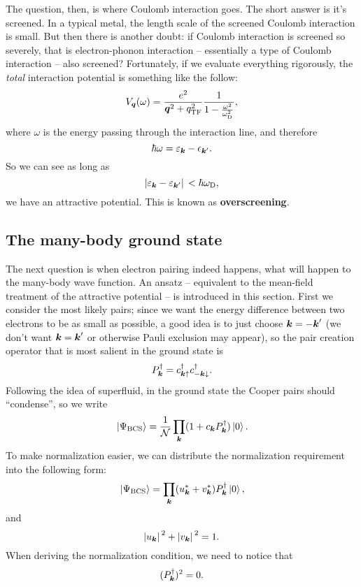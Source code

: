 \documentclass[hyperref, a4paper]{article}
\newcommand*{\concept}[1]{{\textbf{#1}}}
\begin{document}
The question, then, is where Coulomb interaction goes.
The short answer is it's screened.
In a typical metal, 
the length scale of the screened Coulomb interaction is small.
But then there is another doubt: 
if Coulomb interaction is screened so severely, 
that is electron-phonon interaction -- essentially a type of Coulomb interaction 
-- also screened?
Fortunately, if we evaluate everything rigorously, 
the \emph{total} interaction potential is something like the follow:
\begin{equation}
    V_{\vb*{q}}(\omega) = \frac{e^2}{\vb*{q}^2 + q_{\text{TF}}^2} \frac{1}{1 - \frac{\omega^2}{\omega_{\text{D}}^2}},
\end{equation}
where $\omega$ is the energy passing through the interaction line,
and therefore 
\begin{equation}
    \hbar \omega = \varepsilon_{\vb*{k}} - \epsilon_{\vb*{k}'}.
\end{equation} 
So we can see as long as 
\begin{equation}
    \abs*{\varepsilon_{\vb*{k}} - \varepsilon_{\vb*{k}'}}  < \hbar \omega_{\text{D}},
\end{equation}
we have an attractive potential.
This is known as \concept{overscreening}.

\subsection{The many-body ground state}

The next question is when electron pairing indeed happens,
what will happen to the many-body wave function.
An ansatz -- equivalent to the mean-field treatment of the attractive potential -- is 
introduced in this section.
First we consider the most likely pairs;
since we want the energy difference between two electrons to be as small as possible, 
a good idea is to just choose $\vb*{k} = - \vb*{k}'$
(we don't want $\vb*{k} = \vb*{k}'$ 
or otherwise Pauli exclusion may appear),
so the pair creation operator that is 
most salient in the ground state is 
\begin{equation}
    P^\dagger_{\vb*{k}} = c^\dagger_{\vb*{k} \uparrow} c^\dagger_{- \vb*{k} \downarrow}.
\end{equation}
Following the idea of superfluid, 
in the ground state the Cooper pairs should ``condense'',
so we write 
\begin{equation}
    \ket*{\Psi_{\text{BCS}}} = \frac{1}{\mathcal{N}} \prod_{\vb*{k}} (1 + c_{\vb*{k}} P_{\vb*{k}}^\dagger) \ket*{0}.
\end{equation}
To make normalization easier, 
we can distribute the normalization requirement into the following form:
\begin{equation}
    \ket*{\Psi_{\text{BCS}}} = \prod_{\vb*{k}}
    (u^*_{\vb*{k}} + v^*_{\vb*{k}}) P^\dagger_{\vb*{k}} \ket*{0},
\end{equation}
and 
\begin{equation}
    \abs*{u_{\vb*{k}}}^2 + \abs*{v_{\vb*{k}}}^2 = 1.
\end{equation}
When deriving the normalization condition,
we need to notice that 
\begin{equation}
    (P_{\vb*{k}}^\dagger)^2 = 0.
\end{equation}
\end{document}
